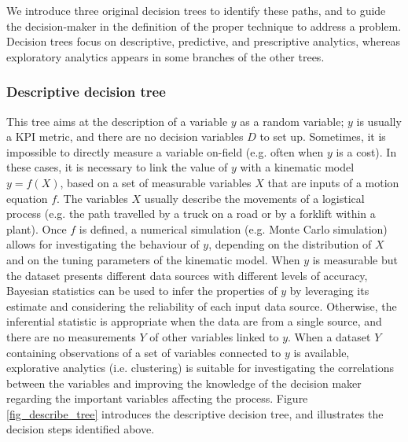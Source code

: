 We introduce three original decision trees to identify these paths, and to guide the decision-maker in the definition of the proper technique to address a problem. Decision trees focus on descriptive, predictive, and prescriptive analytics, whereas exploratory analytics appears in some branches of the other trees.

\subsubsection{Descriptive decision tree}
This tree aims at the description of a variable $y$ as a random variable; $y$ is usually a KPI metric, and there are no decision variables $D$ to set up. Sometimes, it is impossible to directly measure a variable on-field (e.g. often when $y$ is a cost). In these cases, it is necessary to link the value of $y$ with a kinematic model $y=f(X)$, based on a set of measurable variables $X$ that are inputs of a motion equation $f$. The variables $X$ usually describe the movements of a logistical process (e.g. the path travelled by a truck on a road or by a forklift within a plant). Once $f$ is defined, a numerical simulation (e.g. Monte Carlo simulation) allows for investigating the behaviour of $y$, depending on the distribution of $X$ and on the tuning parameters of the kinematic model. When $y$ is measurable but the dataset presents different data sources with different levels of accuracy, Bayesian statistics can be used to infer the properties of $y$ by leveraging its estimate and considering the reliability of each input data source. Otherwise, the inferential statistic is appropriate when the data are from a single source, and there are no measurements $Y$ of other variables linked to $y$. When a dataset $Y$ containing observations of a set of variables connected to $y$ is available, explorative analytics (i.e. clustering) is suitable for investigating the correlations between the variables and improving the knowledge of the decision maker regarding the important variables affecting the process. Figure \ref{fig_describe_tree} introduces the descriptive decision tree, and illustrates the decision steps identified above.

